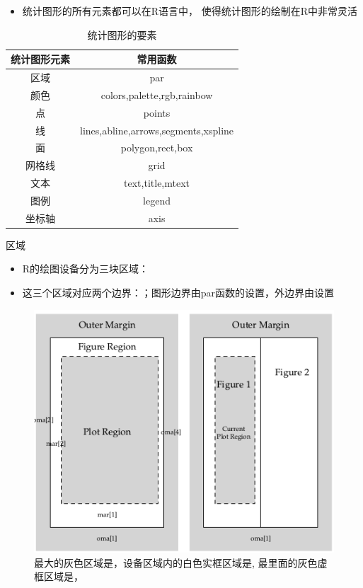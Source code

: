 \documentclass{beamerthemeMono}
\begin{document}
\begin{frame}[t]{\subsecname}
\begin{itemize}
\item 统计图形的所有元素都可以在R语言中，
使得统计图形的绘制在R中非常灵活
\end{itemize}

\begin{overlayarea}{\textwidth}{\textheight}
  \begin{table} \centering \small
    \begin{tabular}{|c|c|}
      \toprule
      \rowcolor{LightCyan}
      统计图形元素 & 常用函数\\\hline
      区域 & par\\\hline
      颜色 & colors,palette,rgb,rainbow\\\hline
      点 & points\\\hline
      线 & lines,abline,arrows,segments,xspline\\\hline
      面 & polygon,rect,box \\\hline
      网格线 & grid \\\hline
      文本 & text,title,mtext \\\hline
      图例 & legend\\\hline
      坐标轴 & axis \\   
      \bottomrule
    \end{tabular}
    \caption{统计图形的要素}
  \end{table}
\end{overlayarea}  
\end{frame}

\begin{frame}[t]{\subsecname}{区域}
\begin{itemize}
\item R的绘图设备分为三块区域：
\item 这三个区域对应两个边界：；图形边界由par函数的设置，外边界由设置
\end{itemize}  

\begin{figure}
  \centering
  \includegraphics[width=0.5\columnwidth]{plot_region.png}
  \caption{最大的灰色区域是，设备区域内的白色实框区域是,
最里面的灰色虚框区域是，}
\end{figure}
\end{frame}
\end{document}
